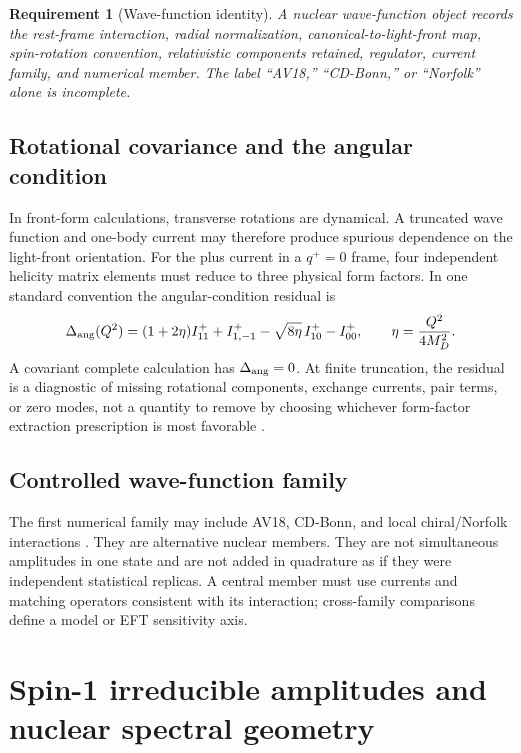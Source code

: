 \documentclass[11pt]{article}
\newtheorem{requirement}[definition]{Requirement}
\begin{document}
\begin{requirement}[Wave-function identity]
\label{req:wavefunction-identity}
A nuclear wave-function object records the rest-frame interaction, radial
normalization, canonical-to-light-front map, spin-rotation convention,
relativistic components retained, regulator, current family, and numerical
member.  The label ``AV18,'' ``CD-Bonn,'' or ``Norfolk'' alone is incomplete.
\end{requirement}

\subsection{Rotational covariance and the angular condition}

In front-form calculations, transverse rotations are dynamical.  A truncated
wave function and one-body current may therefore produce spurious dependence
on the light-front orientation.  For the plus current in a \(q^+=0\) frame,
four independent helicity matrix elements must reduce to three physical form
factors.  In one standard convention the angular-condition residual is
\begin{equation}
 \Delta_{\rm ang}(Q^2)
 =(1+2\eta)I_{11}^+
 +I_{1,-1}^+
 -\sqrt{8\eta}\,I_{10}^+
 -I_{00}^+,
 \qquad
 \eta=\frac{Q^2}{4M_D^2}.
\label{eq:angular-condition}
\end{equation}
A covariant complete calculation has \(\Delta_{\rm ang}=0\).  At finite
truncation, the residual is a diagnostic of missing rotational components,
exchange currents, pair terms, or zero modes, not a quantity to remove by
choosing whichever form-factor extraction prescription is most favorable
\cite{Carbonell1998,CookeMiller2002}.

\subsection{Controlled wave-function family}

The first numerical family may include AV18, CD-Bonn, and local chiral/Norfolk
interactions \cite{Wiringa1995,Machleidt2001,Piarulli2016}.  They are
alternative nuclear members.  They are not simultaneous amplitudes in one
state and are not added in quadrature as if they were independent statistical
replicas.  A central member must use currents and matching operators
consistent with its interaction; cross-family comparisons define a model or
EFT sensitivity axis.

\section{Spin-1 irreducible amplitudes and nuclear spectral geometry}
\label{sec:spectral-geometry}
\end{document}
